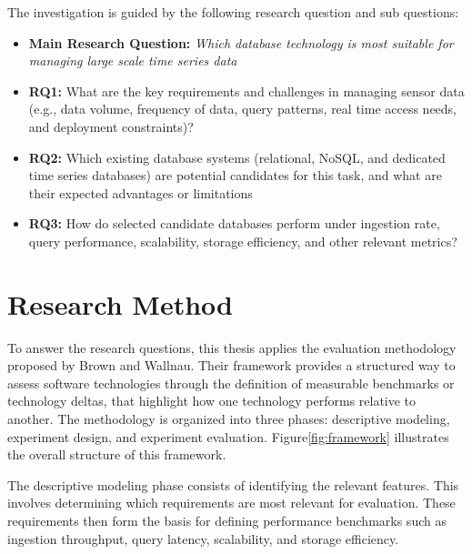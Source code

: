 The investigation is guided by the following research question and sub
questions:

\begin{itemize}
      \item \textbf{Main Research Question:} \emph{Which database technology is
                  most suitable for managing large scale time series data
            }
      \item \textbf{RQ1:} What are the key requirements and challenges in
            managing %
            sensor data (e.g., data volume, frequency of data, query patterns,
            real time access needs, and deployment constraints)?
      \item \textbf{RQ2:} Which existing database systems (relational, NoSQL,
            and dedicated time series databases) are potential candidates for
            this task, and what are their expected advantages or limitations
      \item \textbf{RQ3:} How do selected candidate databases perform under
            ingestion rate, query performance, scalability, storage efficiency,
            and other relevant metrics?
\end{itemize}

\newpage
\section{Research Method}
To answer the research questions, this thesis applies the evaluation
methodology proposed by Brown and Wallnau\cite{Brown1996}. Their framework
provides a structured way to assess software technologies through the
definition of measurable benchmarks or technology deltas, that highlight how
one technology performs relative to another. The methodology is organized into
three phases: descriptive modeling, experiment design, and experiment
evaluation. Figure\ref{fig:framework} illustrates the overall structure of this
framework.

The descriptive modeling phase consists of identifying the relevant features.
This involves determining which requirements are most relevant for evaluation.
These requirements then form the basis for defining performance benchmarks such
as ingestion throughput, query latency, scalability, and storage efficiency.


